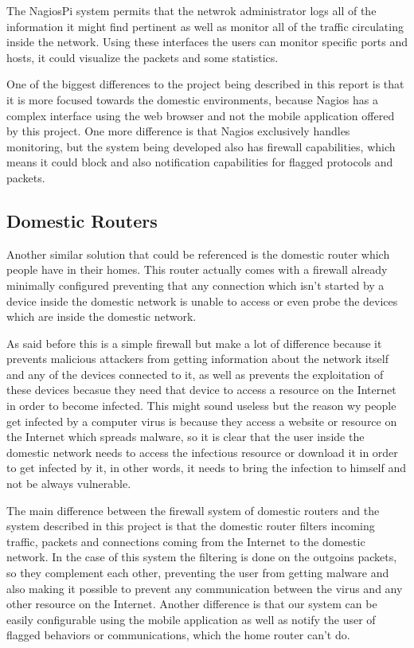 The NagiosPi system permits that the netwrok administrator logs all of the
information it might find pertinent as well as monitor all of the traffic
circulating inside the network. Using these interfaces the users can monitor
specific ports and hosts, it could visualize the packets and some statistics.

One of the biggest differences to the project being described in this report is
that it is more focused towards the domestic environments, because Nagios has a
complex interface using the web browser and not the mobile application offered
by this project. One more difference is that Nagios exclusively handles
monitoring, but the system being developed also has firewall capabilities, which
means it could block and also notification capabilities for flagged protocols
and packets.

\subsection{Domestic Routers}
\label{chap2:sec:similar-sol:sub:routers}
Another similar solution that could be referenced is the domestic router which
people have in their homes. This router actually comes with a firewall already
minimally configured preventing that any connection which isn't started by a
device inside the domestic network is unable to access or even probe the devices
which are inside the domestic network.

As said before this is a simple firewall but make a lot of difference because it
prevents malicious attackers from getting information about the network itself
and any of the devices connected to it, as well as prevents the exploitation of
these devices becasue they need that device to access a resource on the Internet
in order to become infected. This might sound useless but the reason wy people
get infected by a computer virus is because they access a website or resource on
the Internet which spreads malware, so it is clear that the user inside the
domestic network needs to access the infectious resource or download it in order
to get infected by it, in other words, it needs to bring the infection to
himself and not be always vulnerable.

The main difference between the firewall system of domestic routers and the
system described in this project is that the domestic router filters incoming
traffic, packets and connections coming from the Internet to the domestic
network. In the case of this system the filtering is done on the outgoins
packets, so they complement each other, preventing the user from getting malware
and also making it possible to prevent any communication between the virus and
any other resource on the Internet.
Another difference is that our system can be easily configurable using the
mobile application as well as notify the user of flagged behaviors or
communications, which the home router can't do.


